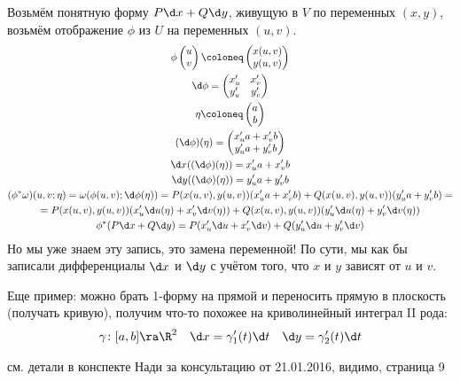 \begin{exmp}
	Возьмём понятную форму $P \d x + Q \d y$, живущую в $V$ по переменных $(x,y)$,
	возьмём отображение $\phi$ из $U$ на переменных $(u,v)$.
	\begin{gather*}
		\phi \begin{pmatrix} u \\ v \end{pmatrix} \coloneq \begin{pmatrix} x(u, v) \\ y(u, v) \end{pmatrix} \\
		\d \phi = \begin{pmatrix} x_u' & x_v' \\ y_u' & y_v' \end{pmatrix} \\
		\eta \coloneq \begin{pmatrix} a \\ b \end{pmatrix} \\
		(\d \phi)(\eta) = \begin{pmatrix} x_u'a + x_v'b \\ y_u'a + y_v'b \end{pmatrix} \\
		\d x ((\d \phi)(\eta)) = x_u'a + x_v'b \\
		\d y ((\d \phi)(\eta)) = y_u'a + y_v'b \\
		(\phi^* \omega) (u, v; \eta)
		= \omega(\phi(u, v); \d \phi(\eta))
		= P(x(u, v), y(u, v)) (x_u' a + x_v' b)
		+ Q(x(u, v), y(u, v)) (y_u' a + y_v' b) = \\
		= P(x(u, v), y(u, v)) (x_u' \d u(\eta) + x_v' \d v(\eta))
		+ Q(x(u, v), y(u, v)) (y_u' \d u(\eta) + y_v' \d v(\eta)) \\
		\phi^* (P \d x + Q \d y) = P(x_u' \d u + x_v' \d v) + Q(y_u' \d u + y_v' \d v)
	\end{gather*}
	Но мы уже знаем эту запись, это замена переменной!
	По сути, мы как бы записали дифференциалы $\d x$ и $\d y$ с учётом того, что
	$x$ и $y$ зависят от $u$ и $v$.

	Еще пример: можно брать 1-форму на прямой и переносить прямую в плоскость (получать кривую),
	получим что-то похожее на криволинейный интеграл II рода:
	\begin{gather*}
		\gamma\colon [a, b] \ra \R^2 \quad \d x = \gamma_1'(t) \d t \quad \d y = \gamma_2'(t) \d t
	\end{gather*}

	\TODO см. детали в конспекте Нади за консультацию от 21.01.2016, видимо, страница 9
\end{exmp}

